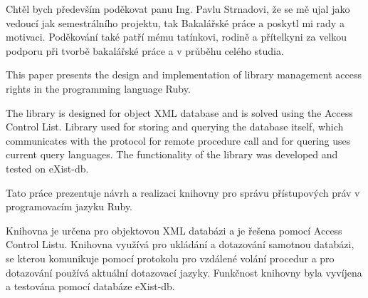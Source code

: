 \documentclass[11pt,twoside,a4paper]{book}
\begin{document}

\coverpagestarts


\acknowledgements
\noindent
Chtěl bych především poděkovat panu Ing. Pavlu Strnadovi, že se mě ujal jako vedoucí jak semestrálního projektu, tak Bakalářské práce a poskytl mi rady a motivaci. Poděkování také patří mému tatínkovi, rodině a přítelkyni za velkou podporu při tvorbě bakalářské práce a v průběhu celého studia.




 
\abstractpage
This paper presents the design and implementation of library management access rights in the programming language Ruby.

The library is designed for object XML database and is solved using the Access Control List. Library used for storing and querying the database itself, which communicates with the protocol for remote procedure call and for quering uses current query languages.
The functionality of the library was developed and tested on eXist-db.


\baselineskip

\noindent
Tato práce prezentuje návrh a realizaci knihovny pro správu přístupových práv v programovacím jazyku Ruby. 

Knihovna  je určena pro objektovou XML databázi a je řešena pomocí Access Control Listu. Knihovna využívá pro ukládání a dotazování samotnou databázi, se kterou komunikuje pomocí protokolu pro vzdálené volání procedur a pro dotazování používá aktuální dotazovací jazyky. 
Funkčnost knihovny byla vyvíjena a testována pomocí databáze eXist-db.


\noindent

%


\tableofcontents
\end{document}
